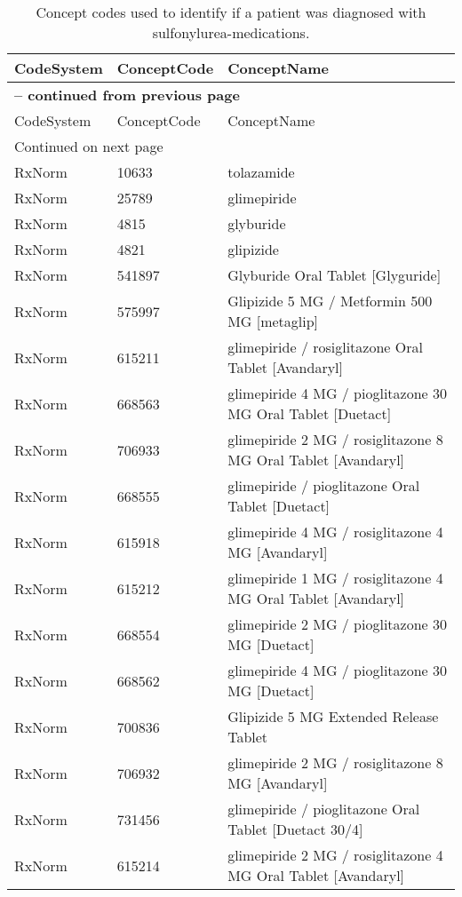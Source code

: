 \begin{longtable}{p{}p{}p{}}
\caption{Concept codes used to identify if a patient was diagnosed with sulfonylurea-medications.} \\ 
 CodeSystem & ConceptCode & ConceptName \\ 
  \hline 
\endfirsthead 
\multicolumn{3}{p{\textwidth}}{{ \bfseries \tablename \thetable{} -- continued from previous page}} \\ 
\hline CodeSystem & ConceptCode & ConceptName \\ \hline 
\endhead 
\hline \multicolumn{3}{p{\textwidth}}{{Continued on next page}} \\ \hline 
\endfoot 
\hline 
\endlastfoot 
 \hline
RxNorm & 10633 & tolazamide \\ 
  RxNorm & 25789 & glimepiride \\ 
  RxNorm & 4815 & glyburide \\ 
  RxNorm & 4821 & glipizide \\ 
  RxNorm & 541897 & Glyburide Oral Tablet [Glyguride] \\ 
  RxNorm & 575997 & Glipizide 5 MG / Metformin 500 MG [metaglip] \\ 
  RxNorm & 615211 & glimepiride / rosiglitazone Oral Tablet [Avandaryl] \\ 
  RxNorm & 668563 & glimepiride 4 MG / pioglitazone 30 MG Oral Tablet [Duetact] \\ 
  RxNorm & 706933 & glimepiride 2 MG / rosiglitazone 8 MG Oral Tablet [Avandaryl] \\ 
  RxNorm & 668555 & glimepiride / pioglitazone Oral Tablet [Duetact] \\ 
  RxNorm & 615918 & glimepiride 4 MG / rosiglitazone 4 MG [Avandaryl] \\ 
  RxNorm & 615212 & glimepiride 1 MG / rosiglitazone 4 MG Oral Tablet [Avandaryl] \\ 
  RxNorm & 668554 & glimepiride 2 MG / pioglitazone 30 MG [Duetact] \\ 
  RxNorm & 668562 & glimepiride 4 MG / pioglitazone 30 MG [Duetact] \\ 
  RxNorm & 700836 & Glipizide 5 MG Extended Release Tablet \\ 
  RxNorm & 706932 & glimepiride 2 MG / rosiglitazone 8 MG [Avandaryl] \\ 
  RxNorm & 731456 & glimepiride / pioglitazone Oral Tablet [Duetact 30/4] \\ 
  RxNorm & 615214 & glimepiride 2 MG / rosiglitazone 4 MG Oral Tablet [Avandaryl] \\ 

\end{longtable}
